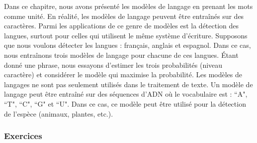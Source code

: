 \documentclass{KodeBook}
\begin{document}
Dans ce chapitre, nous avons présenté les modèles de langage en prenant les mots comme unité. 
En réalité, les modèles de langage peuvent être entraînés sur des caractères. 
Parmi les applications de ce genre de modèles est la détection des langues, surtout pour celles qui utilisent le même système d'écriture. 
Supposons que nous voulons détecter les langues : français, anglais et espagnol. 
Dans ce cas, nous entraînons trois modèles de langage pour chacune de ces langues. 
Étant donné une phrase, nous essayons d'estimer les trois probabilités (niveau caractère) et considérer le modèle qui maximise la probabilité. 
Les modèles de langages ne sont pas seulement utilisés dans le traitement de texte.
Un modèle de langage peut être entraîné sur des séquences d'ADN où le vocabulaire est : ``A", ``T", ``C", ``G" et ``U". 
Dans ce cas, ce modèle peut être utilisé pour la détection de l'espèce (animaux, plantes, etc.). 


\subsubsection*{Exercices}
\end{document}
